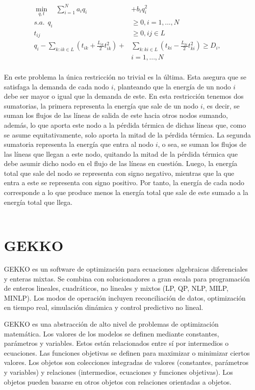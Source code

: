 \documentclass[twoside]{article}
\begin{document}
\begin{multicols}{2}
{ \small
\begin{align*}
\min_{q,t} \quad \sum_{i = 1}^N a_iq_i &+ b_iq_i^2 \\
s.a. \ \ q_i &\geq 0, i = 1,...,N \\
t_{ij} &\geq 0, ij \in L \\
q_i - \sum_{k : ik \in L}{(t_{ik} + \frac{L_{ik}}{2} t_{ik}^2)} + &\sum_{k : ki \in L}{(t_{ki} - \frac{L_{ki}}{2} t_{ki}^2) \geq D_i}, \\
 &i = 1,...,N \\
\end{align*} }

En este problema la \'unica restricci\'on no trivial es la \'ultima. Esta asegura que se satisfaga la demanda de cada nodo $i$, planteando que la energ\'ia de un nodo $i$ debe ser mayor o igual que la demanda de este. En esta restricci\'on tenemos dos sumatorias, la primera representa la energ\'ia que sale de un nodo $i$, es decir, se suman los flujos de las l\'ineas de salida de este hacia otros nodos sumando, adem\'as, lo que aporta este nodo a la p\'erdida t\'ermica de dichas l\'ineas que, como se asume equitativamente, solo aporta la mitad de la p\'erdida t\'ermica. La segunda sumatoria representa la energ\'ia que entra al nodo $i$, o sea, se suman los flujos de las l\'ineas que llegan a este nodo, quitando la mitad de la p\'erdida t\'ermica que debe asumir dicho nodo en el flujo de las l\'ineas en cuesti\'on. Luego, la energ\'ia total que sale del nodo se representa con signo negativo, mientras que la que entra a este se representa con signo positivo. Por tanto, la energ\'ia de cada nodo corresponde a lo que produce menos la energ\'ia total que sale de este sumado a la energ\'ia total que llega.\\\\



\section{GEKKO}

GEKKO es un software de optimizaci\'on para ecuaciones algebraicas diferenciales y enteras mixtas. Se combina con solucionadores a gran escala para programaci\'on de enteros lineales, cuadr\'aticos, no lineales y mixtos (LP, QP, NLP, MILP, MINLP). Los modos de operaci\'on incluyen reconciliaci\'on de datos, optimizaci\'on en tiempo real, simulaci\'on din\'amica y control predictivo no lineal.

GEKKO es una abstracci\'on de alto nivel de problemas de optimizaci\'on matem\'atica. Los valores de los modelos se definen mediante constantes, par\'ametros y variables. Estos est\'an relacionados entre s\'i por intermedios o ecuaciones. Las funciones objetivas se definen para maximizar o minimizar ciertos valores. Los objetos son colecciones integradas de valores (constantes, par\'ametros y variables) y relaciones (intermedios, ecuaciones y funciones objetivas). Los objetos pueden basarse en otros objetos con relaciones orientadas a objetos.


\end{multicols}
\end{document}
